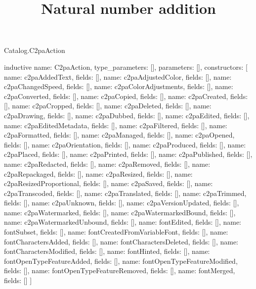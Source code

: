 \begin{lexlean}{Catalog.C2paAction}
\title{Natural number addition}
\begin{semanticmodule}
inductive{
  name: C2paAction,
  type_parameters: [],
  parameters: [],
  constructors: [
    {name: c2paAddedText, fields: []},
    {name: c2paAdjustedColor, fields: []},
    {name: c2paChangedSpeed, fields: []},
    {name: c2paColorAdjustments, fields: []},
    {name: c2paConverted, fields: []},
    {name: c2paCopied, fields: []},
    {name: c2paCreated, fields: []},
    {name: c2paCropped, fields: []},
    {name: c2paDeleted, fields: []},
    {name: c2paDrawing, fields: []},
    {name: c2paDubbed, fields: []},
    {name: c2paEdited, fields: []},
    {name: c2paEditedMetadata, fields: []},
    {name: c2paFiltered, fields: []},
    {name: c2paFormatted, fields: []},
    {name: c2paManaged, fields: []},
    {name: c2paOpened, fields: []},
    {name: c2paOrientation, fields: []},
    {name: c2paProduced, fields: []},
    {name: c2paPlaced, fields: []},
    {name: c2paPrinted, fields: []},
    {name: c2paPublished, fields: []},
    {name: c2paRedacted, fields: []},
    {name: c2paRemoved, fields: []},
    {name: c2paRepackaged, fields: []},
    {name: c2paResized, fields: []},
    {name: c2paResizedProportional, fields: []},
    {name: c2paSaved, fields: []},
    {name: c2paTranscoded, fields: []},
    {name: c2paTranslated, fields: []},
    {name: c2paTrimmed, fields: []},
    {name: c2paUnknown, fields: []},
    {name: c2paVersionUpdated, fields: []},
    {name: c2paWatermarked, fields: []},
    {name: c2paWatermarkedBound, fields: []},
    {name: c2paWatermarkedUnbound, fields: []},
    {name: fontEdited, fields: []},
    {name: fontSubset, fields: []},
    {name: fontCreatedFromVariableFont, fields: []},
    {name: fontCharactersAdded, fields: []},
    {name: fontCharactersDeleted, fields: []},
    {name: fontCharactersModified, fields: []},
    {name: fontHinted, fields: []},
    {name: fontOpenTypeFeatureAdded, fields: []},
    {name: fontOpenTypeFeatureModified, fields: []},
    {name: fontOpenTypeFeatureRemoved, fields: []},
    {name: fontMerged, fields: []}
  ]
}
\end{semanticmodule}
\end{lexlean}
